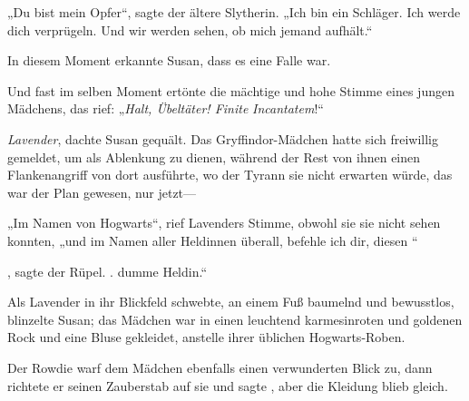 „Du bist mein Opfer“, sagte der ältere Slytherin. „Ich bin ein Schläger. Ich werde dich verprügeln. Und wir werden sehen, ob mich jemand aufhält.“

In diesem Moment erkannte Susan, dass es eine Falle war.

Und fast im selben Moment ertönte die mächtige und hohe Stimme eines jungen Mädchens, das rief: „\emph{Halt, Übeltäter! Finite} \emph{Incantatem}!“

\emph{Lavender}, dachte Susan gequält. Das Gryffindor-Mädchen hatte sich freiwillig gemeldet, um als Ablenkung zu dienen, während der Rest von ihnen einen Flankenangriff von dort ausführte, wo der Tyrann sie nicht erwarten würde, das war der Plan gewesen, nur jetzt—

„Im Namen von Hogwarts“, rief Lavenders Stimme, obwohl sie sie nicht sehen konnten, „und im Namen aller Heldinnen überall, befehle ich dir, diesen “

, sagte der Rüpel. .  dumme Heldin.“

Als Lavender in ihr Blickfeld schwebte, an einem Fuß baumelnd und bewusstlos, blinzelte Susan; das Mädchen war in einen leuchtend karmesinroten und goldenen Rock und eine Bluse gekleidet, anstelle ihrer üblichen Hogwarts-Roben.

Der Rowdie warf dem Mädchen ebenfalls einen verwunderten Blick zu, dann richtete er seinen Zauberstab auf sie und sagte , aber die Kleidung blieb gleich.


